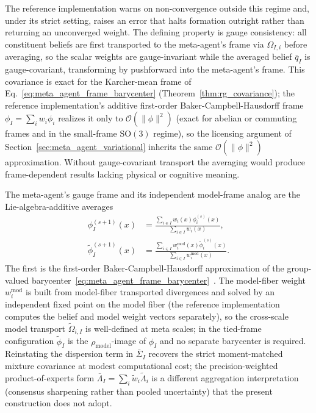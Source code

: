 \documentclass[11pt]{article}
\begin{document}
The reference implementation warns on non-convergence outside this regime and, under its strict setting, raises an error that halts formation outright rather than returning an unconverged weight. The defining property is gauge consistency: all constituent beliefs are first transported to the meta-agent's frame via $\Omega_{I,i}$ before averaging, so the scalar weights are gauge-invariant while the averaged belief $\bar{q}_I$ is gauge-covariant, transforming by pushforward into the meta-agent's frame. This covariance is exact for the Karcher-mean frame of Eq.~\eqref{eq:meta_agent_frame_barycenter} (Theorem~\ref{thm:rg_covariance}); the reference implementation's additive first-order Baker-Campbell-Hausdorff frame $\phi_I = \sum_i w_i \phi_i$ realizes it only to $\mathcal{O}(\|\phi\|^2)$ (exact for abelian or commuting frames and in the small-frame $\mathrm{SO}(3)$ regime), so the licensing argument of Section~\ref{sec:meta_agent_variational} inherits the same $\mathcal{O}(\|\phi\|^2)$ approximation. Without gauge-covariant transport the averaging would produce frame-dependent results lacking physical or cognitive meaning.

The meta-agent's gauge frame and its independent model-frame analog are the Lie-algebra-additive averages
\begin{equation}
\begin{aligned}
\phi_I^{(s+1)}(x)
&= \frac{\sum_{i \in I} w_i(x)\phi_i^{(s)}(x)}{\sum_{i \in I} w_i(x)}, \\
\tilde\phi_I^{(s+1)}(x)
&= \frac{\sum_{i \in I} w_i^{\mathrm{mod}}(x)\tilde\phi_i^{(s)}(x)}{\sum_{i \in I} w_i^{\mathrm{mod}}(x)}.
\end{aligned}
\end{equation}
The first is the first-order Baker-Campbell-Hausdorff approximation of the group-valued barycenter~\eqref{eq:meta_agent_frame_barycenter}~\cite{Hall2015}. The model-fiber weight $w^{\mathrm{mod}}_i$ is built from model-fiber transported divergences and solved by an independent fixed point on the model fiber (the reference implementation computes the belief and model weight vectors separately), so the cross-scale model transport $\tilde\Omega_{i,I}$ is well-defined at meta scales; in the tied-frame configuration $\tilde\phi_I$ is the $\rho_{\mathrm{model}}$-image of $\phi_I$ and no separate barycenter is required. Reinstating the dispersion term in $\bar{\Sigma}_I$ recovers the strict moment-matched mixture covariance at modest computational cost; the precision-weighted product-of-experts form $\bar\Lambda_I = \sum_i \tilde{w}_i \tilde{\Lambda}_i$ is a different aggregation interpretation (consensus sharpening rather than pooled uncertainty) that the present construction does not adopt.
\end{document}
